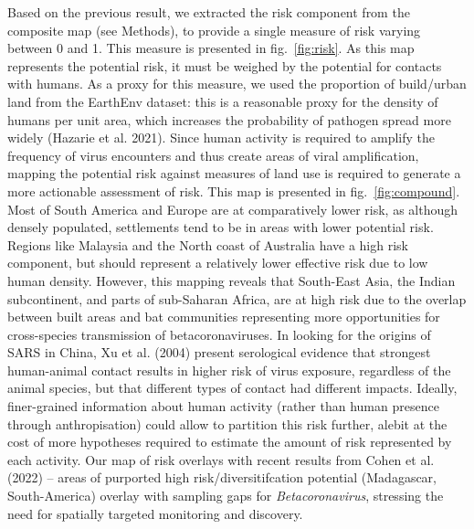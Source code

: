 \documentclass[11pt]{article}
\begin{document}
Based on the previous result, we extracted the risk component from the
composite map (see Methods), to provide a single measure of risk varying
between 0 and 1. This measure is presented in fig.~\ref{fig:risk}. As
this map represents the potential risk, it must be weighed by the
potential for contacts with humans. As a proxy for this measure, we used
the proportion of build/urban land from the EarthEnv dataset: this is a
reasonable proxy for the density of humans per unit area, which
increases the probability of pathogen spread more widely (Hazarie et al.
2021). Since human activity is required to amplify the frequency of
virus encounters and thus create areas of viral amplification, mapping
the potential risk against measures of land use is required to generate
a more actionable assessment of risk. This map is presented in
fig.~\ref{fig:compound}. Most of South America and Europe are at
comparatively lower risk, as although densely populated, settlements
tend to be in areas with lower potential risk. Regions like Malaysia and
the North coast of Australia have a high risk component, but should
represent a relatively lower effective risk due to low human density.
However, this mapping reveals that South-East Asia, the Indian
subcontinent, and parts of sub-Saharan Africa, are at high risk due to
the overlap between built areas and bat communities representing more
opportunities for cross-species transmission of betacoronaviruses. In
looking for the origins of SARS in China, Xu et al. (2004) present
serological evidence that strongest human-animal contact results in
higher risk of virus exposure, regardless of the animal species, but
that different types of contact had different impacts. Ideally,
finer-grained information about human activity (rather than human
presence through anthropisation) could allow to partition this risk
further, alebit at the cost of more hypotheses required to estimate the
amount of risk represented by each activity. Our map of risk overlays
with recent results from Cohen et al. (2022) -- areas of purported high
risk/diversitifcation potential (Madagascar, South-America) overlay with
sampling gaps for \emph{Betacoronavirus}, stressing the need for
spatially targeted monitoring and discovery.
\end{document}
